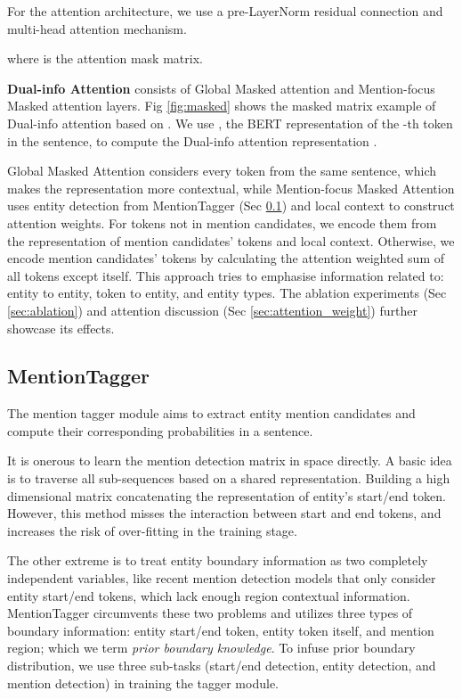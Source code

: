 \documentclass[11pt,a4paper]{article}
\begin{document}
For the attention architecture, we use a pre-LayerNorm residual connection and multi-head attention mechanism.

where  is the attention mask matrix.



\textbf{Dual-info Attention} consists of {Global Masked attention} and {Mention-focus Masked attention} layers.
Fig \ref{fig:masked} shows the masked matrix example of Dual-info attention based on  \cite{devlin2018pretraining}.
We use , the BERT representation of the -th token in the sentence, to compute the Dual-info attention representation .


{Global Masked Attention} considers every token from the same sentence, which makes the representation more contextual, 
while {Mention-focus Masked Attention} uses entity detection from MentionTagger (Sec \ref{subsec:MentionTagger}) and local context to construct attention weights.
For tokens not in mention candidates, we encode them from the representation of mention candidates’ tokens and local context.
Otherwise, we encode mention candidates’ tokens by calculating the attention weighted sum of all tokens except itself.
This approach tries to emphasise information related to: entity to entity, token to entity, and entity types.
The ablation experiments (Sec \ref{sec:ablation}) and attention discussion (Sec \ref{sec:attention_weight}) further showcase its effects.

\subsection{MentionTagger}
\label{subsec:MentionTagger}

The mention tagger module aims to extract entity mention candidates and compute their corresponding probabilities in a sentence. 

It is onerous to learn the mention detection matrix in  space directly.
A basic idea is to traverse all sub-sequences based on a shared representation.
Building a high dimensional matrix concatenating the representation of entity's start/end token.
However, this method misses the interaction between start and end tokens, and increases the risk of over-fitting in the training stage.


The other extreme is to treat entity boundary information as two completely independent variables, like recent mention detection models \cite{zheng2019boundary,tan2020boundary} that only consider entity start/end tokens, which lack enough region contextual information. 
MentionTagger circumvents these two problems and utilizes three types of boundary information: entity start/end token, entity token itself, and mention region; which we term \textit{prior boundary knowledge}.
To infuse prior boundary distribution, we use three sub-tasks (start/end detection, entity detection, and mention detection) in training the tagger module.
\end{document}
